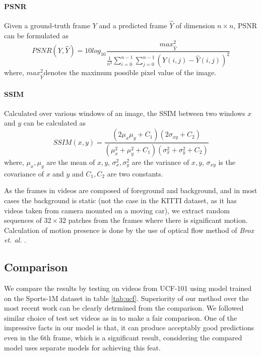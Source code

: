 \documentclass{article}
\begin{document}
  \paragraph{PSNR} Given a ground-truth frame $ Y $ and a predicted frame $ \hat{Y} $ of dimension $ n \times n $, PSNR can be formulated as
  \begin{equation}
  	PSNR(Y, \hat{Y}) = 10 log_{10} \frac{max_{\hat{Y}}^2}{\frac{1}{n^2}\sum_{i=0}^{n-1}\sum_{j=0}^{n-1}(Y(i, j) - \hat{Y}(i, j))^2}
  	\label{eq:psnr}
  \end{equation}
  where, $ max_{\hat{Y}}^2 $denotes the maximum possible pixel value of the image.
  
  \paragraph{SSIM} Calculated over various windows of an image, the SSIM between two windows $ x $ and $ y $ can be calculated as
  \begin{equation}
  	SSIM(x, y) = \frac{(2\mu_x \mu_y + C_1)(2 \sigma_{xy} + C_2)}{(\mu_x^2 + \mu_y^2 + C_1)(\sigma_x^2 + \sigma_y^2 + C_2)}
  \end{equation} 
  where, $ \mu_x, \mu_y $ are the mean of $ x,y $, $ \sigma_x^2, \sigma_y^2 $ are the variance of $ x,y $, $ \sigma_{xy} $ is the covariance of $ x $ and $ y $ and $ C_1, C_2 $ are two constants.
  
  As the frames in videos are composed of foreground and background, and in most cases the background is static (not the case in the KITTI dataset, as it has videos taken from camera mounted on a moving car), we extract random sequences of $ 32 \times 32 $ patches from the frames where there is significant motion. Calculation of motion presence is done by the use of optical flow method of \textit{Brox et. al.} \cite{brox2011large}.
  
\subsection{Comparison}
  We compare the results by testing on videos from UCF-101 using model trained on the Sports-1M dataset in table \ref{tab:ucf}. Superiority of our method over the most recent work \cite{mathieu2015deep} can be clearly detrmined from the comparison. We followed similar choice of test set videos as in \cite{mathieu2015deep} to make a fair comparison. One of the impressive facts in our model is that, it can produce acceptably good predictions even in the 6th frame, which is a significant result, considering the compared model uses separate models for achieving this feat. 
  
\end{document}
